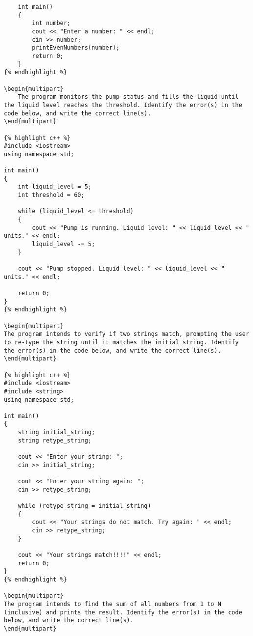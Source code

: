 \begin{problem}
\begin{verbatim}
    int main()
    {
        int number;
        cout << "Enter a number: " << endl;
        cin >> number;
        printEvenNumbers(number);
        return 0;
    }
{% endhighlight %}

\begin{multipart}
    The program monitors the pump status and fills the liquid until the liquid level reaches the threshold. Identify the error(s) in the code below, and write the correct line(s).
\end{multipart}

{% highlight c++ %}
#include <iostream>
using namespace std;

int main()
{
    int liquid_level = 5;
    int threshold = 60;

    while (liquid_level <= threshold)
    {
        cout << "Pump is running. Liquid level: " << liquid_level << " units." << endl;
        liquid_level -= 5;
    }

    cout << "Pump stopped. Liquid level: " << liquid_level << " units." << endl;

    return 0;
}
{% endhighlight %}

\begin{multipart}
The program intends to verify if two strings match, prompting the user to re-type the string until it matches the initial string. Identify the error(s) in the code below, and write the correct line(s).
\end{multipart}

{% highlight c++ %}
#include <iostream>
#include <string>
using namespace std;

int main() 
{
    string initial_string;
    string retype_string;

    cout << "Enter your string: ";
    cin >> initial_string;

    cout << "Enter your string again: ";
    cin >> retype_string;

    while (retype_string = initial_string) 
    {
        cout << "Your strings do not match. Try again: " << endl;
        cin >> retype_string;
    }

    cout << "Your strings match!!!!" << endl;
    return 0;
}
{% endhighlight %}

\begin{multipart}
The program intends to find the sum of all numbers from 1 to N (inclusive) and prints the result. Identify the error(s) in the code below, and write the correct line(s).
\end{multipart}


\end{verbatim}
\end{problem}
